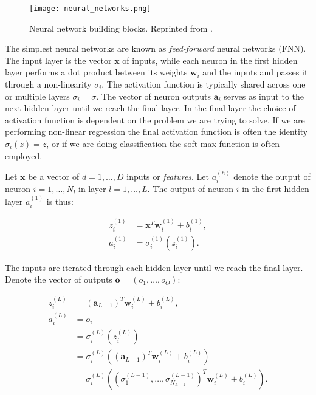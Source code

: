 \begin{figure}[h]
    \centering
    \texttt{[image: neural\_networks.png]}
    \caption{Neural network building blocks. Reprinted from
    \parencite[Vieira, Pinaya, Mechelli]{vieira2017using}.}
    \label{fig:neural-networks}
\end{figure}

The simplest neural networks are known as \textit{feed-forward} neural networks (FNN).
The input layer is the vector $\bm{x}$ of inputs, while each neuron in the first
hidden layer performs a dot product between its weights $\bm{w}_i$ and the inputs
and passes it through a non-linearity $\sigma_i$. The activation function
is typically shared across one or multiple layers $\sigma_i = \sigma$. The vector of neuron outputs
$\bm{a}_i$ serves as input to the next hidden layer until we reach the final layer.
In the final layer the choice of activation function is dependent on the problem
we are trying to solve. If we are performing non-linear regression the
final activation function is often the identity $\sigma_i(z) = z$, or if
we are doing classification the soft-max function is often employed.

Let $\bm{x}$ be a vector of $d = 1,\dots,D$ inputs or 
\textit{features}. Let $a_i^{(h)}$
denote the output of neuron $i = 1,\dots,N_l$ in layer $l = 1,\dots,L$.
The output of neuron $i$ in the first hidden layer $a_i^{(1)}$ is thus:

\begin{equation}
\begin{split}
    z_i^{(1)} &= \bm{x}^T \bm{w}_i^{(1)} + b_i^{(1)} , \\
    a_i^{(1)} &= \sigma_i^{(1)}(z_i^{(1)}) . 
\end{split}
\end{equation}

The inputs are iterated through each hidden layer until we reach the final layer.
Denote the vector of outputs $\bm{o} = \left(o_1,\dots,o_O\right)$:

\begin{equation}
\begin{split}
    z_i^{(L)} &= (\bm{a}_{L-1})^T \bm{w}_i^{(L)} + b_i^{(L)} , \\
    a_i^{(L)} &= o_i \\
              &= \sigma_i^{(L)}(z_i^{(L)}) \\
    &= \sigma_i^{(L)} \left((\bm{a}_{L-1})^T \bm{w}_i^{(L)} + b_i^{(L)} \right) \\
    &= \sigma_i^{(L)} \left(
    \left( \sigma_1^{(L-1)},\dots,\sigma_{N_{L-1}}^{(L-1)} \right)^T
    \bm{w}_i^{(L)} + b_i^{(L)} \right) .
\end{split}
\end{equation}

